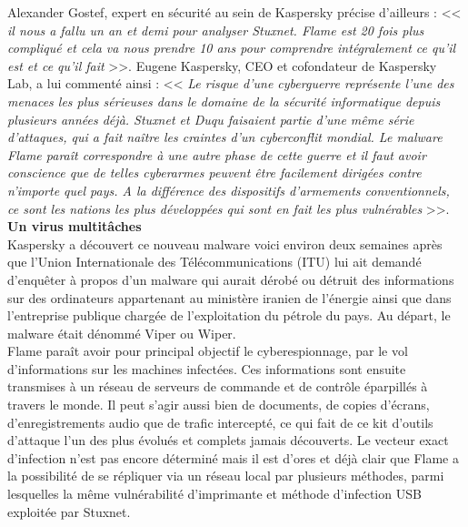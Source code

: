 \documentclass[11pt,twoside,a4paper]{article}
\begin{document}
Alexander Gostef, expert en s{\'e}curit{\'e} au sein de Kaspersky pr{\'e}cise d'ailleurs : << \emph{il nous a fallu un an et demi pour analyser Stuxnet. Flame est 20 fois plus compliqu{\'e} et cela va nous prendre 10 ans pour comprendre int{\'e}gralement ce qu'il est et ce qu'il fait } >>. Eugene Kaspersky, CEO et cofondateur de Kaspersky Lab, a lui comment{\'e} ainsi : << \emph{Le risque d'une cyberguerre repr{\'e}sente l'une des menaces les plus s{\'e}rieuses dans le domaine de la s{\'e}curit{\'e} informatique depuis plusieurs ann{\'e}es d{\'e}j{\`a}. Stuxnet et Duqu faisaient partie d'une m{\^e}me s{\'e}rie d'attaques, qui a fait na{\^i}tre les craintes d'un cyberconflit mondial. Le malware Flame para{\^i}t correspondre {\`a} une autre phase de cette guerre et il faut avoir conscience que de telles cyberarmes peuvent {\^e}tre facilement dirig{\'e}es contre n'importe quel pays. A la diff{\'e}rence des dispositifs d'armements conventionnels, ce sont les nations les plus d{\'e}velopp{\'e}es qui sont en fait les plus vuln{\'e}rables } >>.~\\

\textbf{\large Un virus multit{\^a}ches}~\\

Kaspersky a d{\'e}couvert ce nouveau malware voici environ deux semaines apr{\`e}s que l'Union Internationale des T{\'e}l{\'e}communications (ITU) lui ait demand{\'e} d'enqu{\^e}ter {\`a} propos d'un malware qui aurait d{\'e}rob{\'e} ou d{\'e}truit des informations sur des ordinateurs appartenant au minist{\`e}re iranien de l'{\'e}nergie ainsi que dans l'entreprise publique charg{\'e}e de l'exploitation du p{\'e}trole du pays. Au d{\'e}part, le malware {\'e}tait d{\'e}nomm{\'e} Viper ou Wiper.~\\

Flame para{\^i}t avoir pour principal objectif le cyberespionnage, par le vol d'informations sur les machines infect{\'e}es. Ces informations sont ensuite transmises {\`a} un r{\'e}seau de serveurs de commande et de contr{\^o}le {\'e}parpill{\'e}s {\`a} travers le monde. Il peut s'agir aussi bien de documents, de copies d'{\'e}crans, d'enregistrements audio que de trafic intercept{\'e}, ce qui fait de ce kit d'outils d'attaque l'un des plus {\'e}volu{\'e}s et complets jamais d{\'e}couverts. Le vecteur exact d'infection n'est pas encore d{\'e}termin{\'e} mais il est d'ores et d{\'e}j{\`a} clair que Flame a la possibilit{\'e} de se r{\'e}pliquer via un r{\'e}seau local par plusieurs m{\'e}thodes, parmi lesquelles la m{\^e}me vuln{\'e}rabilit{\'e} d'imprimante et m{\'e}thode d'infection USB exploit{\'e}e par Stuxnet.~\\
\end{document}
